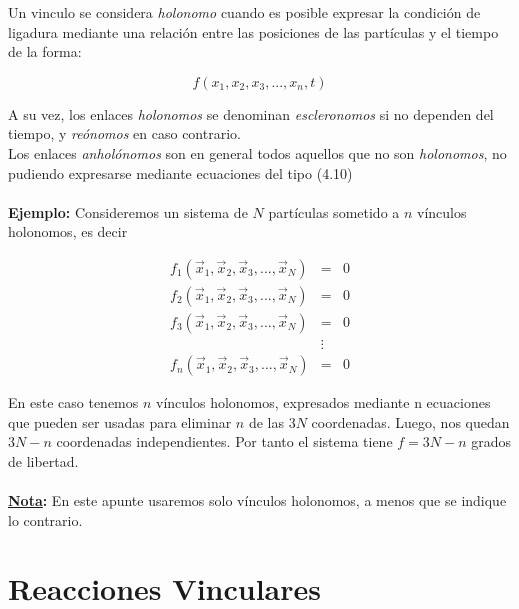 \documentclass[12pt]{report}
\begin{document}
Un vinculo se considera \textit{holonomo} cuando es posible expresar la condición de ligadura mediante una relación entre las posiciones de las partículas 	y el tiempo de la forma:

\begin{equation}
f(x_1 , x_2 , x_3 , ..., x_n, t)
\end{equation}

A su vez, los enlaces \textit{holonomos} se denominan \textit{escleronomos} si no dependen del tiempo, y \textit{reónomos} en caso contrario. \\

Los enlaces \textit{anholónomos} son en general todos aquellos que no son \textit{holonomos}, no pudiendo expresarse mediante ecuaciones del tipo (4.10)\\ \\


\textbf{Ejemplo:} Consideremos un sistema de $N$ partículas sometido a $n$ vínculos holonomos, es decir

\begin{eqnarray} \nonumber
f_1(\vec{x}_1, \vec{x}_2, \vec{x}_3, ..., \vec{x}_N )&=&0 \\ \nonumber
f_2(\vec{x}_1, \vec{x}_2, \vec{x}_3, ..., \vec{x}_N )&=&0 \\ \nonumber
f_3(\vec{x}_1, \vec{x}_2, \vec{x}_3, ..., \vec{x}_N )&=&0 \\ \nonumber
&\vdots& \\ \nonumber
f_n(\vec{x}_1, \vec{x}_2, \vec{x}_3, ..., \vec{x}_N ) &=& 0 
\end{eqnarray}


En este caso tenemos $n$ vínculos holonomos, expresados  mediante n ecuaciones que pueden ser usadas para eliminar $n$ de las $3N$ coordenadas. Luego, nos quedan $3N-n$ coordenadas independientes. Por tanto el sistema tiene $f=3N-n$ grados de libertad. \\ \\

\textbf{\underline{Nota}:} En este apunte usaremos solo vínculos holonomos, a menos que se indique lo contrario.














\section{Reacciones Vinculares}
\end{document}

